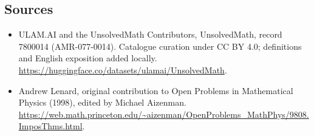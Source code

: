 \documentclass[11pt]{article}
\begin{document}
\subsection{Sources}
\begin{itemize}
\item[\hypertarget{source:7800014:1}{S1}] ULAM.AI and the UnsolvedMath Contributors, UnsolvedMath, record 7800014 (AMR-077-0014). Catalogue curation under CC BY 4.0; definitions and English exposition added locally.
\url{https://huggingface.co/datasets/ulamai/UnsolvedMath}.
\item[\hypertarget{source:7800014:2}{S2}] Andrew Lenard, original contribution to Open Problems in Mathematical Physics (1998), edited by Michael Aizenman.
\url{https://web.math.princeton.edu/~aizenman/OpenProblems_MathPhys/9808.ImposThms.html}.
\end{itemize}
\label{end:7800014}
\end{document}
